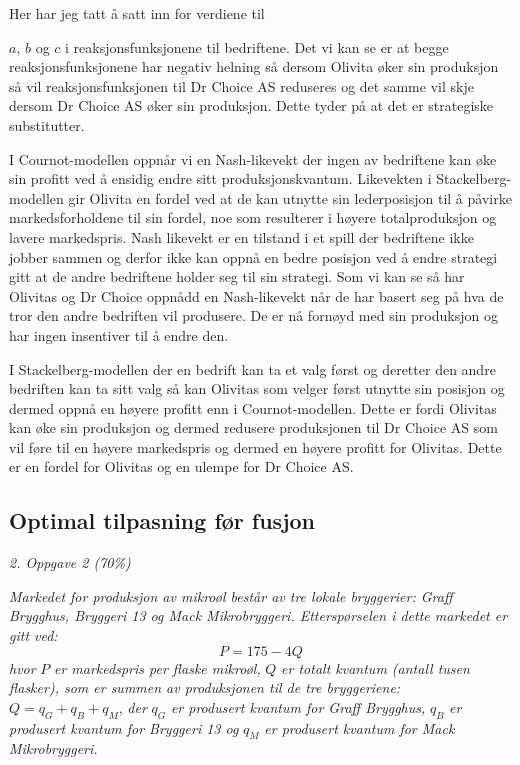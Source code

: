\documentclass[
  12pt,
  a4paper,
  DIV=11,
  numbers=noendperiod]{scrartcl}
\begin{document}
\hypertarget{begrunnelse}{Her har jeg tatt å satt inn for verdiene til}

\(a\), \(b\) og \(c\) i reaksjonsfunksjonene til bedriftene. Det vi kan
se er at begge reaksjonsfunksjonene har negativ helning så dersom
Olivita øker sin produksjon så vil reaksjonsfunksjonen til Dr Choice AS
reduseres og det samme vil skje dersom Dr Choice AS øker sin produksjon.
Dette tyder på at det er strategiske substitutter.

I Cournot-modellen oppnår vi en Nash-likevekt der ingen av bedriftene
kan øke sin profitt ved å ensidig endre sitt produksjonskvantum.
Likevekten i Stackelberg-modellen gir Olivita en fordel ved at de kan
utnytte sin lederposisjon til å påvirke markedsforholdene til sin
fordel, noe som resulterer i høyere totalproduksjon og lavere
markedspris. Nash likevekt er en tilstand i et spill der bedriftene ikke
jobber sammen og derfor ikke kan oppnå en bedre posisjon ved å endre
strategi gitt at de andre bedriftene holder seg til sin strategi. Som vi
kan se så har Olivitas og Dr Choice oppnådd en Nash-likevekt når de har
basert seg på hva de tror den andre bedriften vil produsere. De er nå
fornøyd med sin produksjon og har ingen insentiver til å endre den.

I Stackelberg-modellen der en bedrift kan ta et valg først og deretter
den andre bedriften kan ta sitt valg så kan Olivitas som velger først
utnytte sin posisjon og dermed oppnå en høyere profitt enn i
Cournot-modellen. Dette er fordi Olivitas kan øke sin produksjon og
dermed redusere produksjonen til Dr Choice AS som vil føre til en høyere
markedspris og dermed en høyere profitt for Olivitas. Dette er en fordel
for Olivitas og en ulempe for Dr Choice AS.

\clearpage

\subsection{Optimal tilpasning før
fusjon}\label{optimal-tilpasning-fuxf8r-fusjon}

\begin{center}
    \Large
    \textit{2.  Oppgave 2 (70\%)}
\end{center}

\textit{Markedet for produksjon av mikroøl består av tre lokale bryggerier: Graff Brygghus, Bryggeri 13 og Mack Mikrobryggeri. Etterspørselen i dette markedet er gitt ved:} 
$$
P = 175-4Q
$$ 
\textit{hvor }$P$ \textit{er markedspris per flaske mikroøl,} $Q$ \textit{er totalt kvantum (antall tusen flasker), som er summen av produksjonen til de tre bryggeriene: }$Q = q_G + q_B + q_M$, \textit{der }$q_G$ \textit{er produsert kvantum for Graff Brygghus,} $q_B$ \textit{er produsert kvantum for Bryggeri 13 og} $q_M$ \textit{er produsert kvantum for Mack Mikrobryggeri.}
\end{document}
